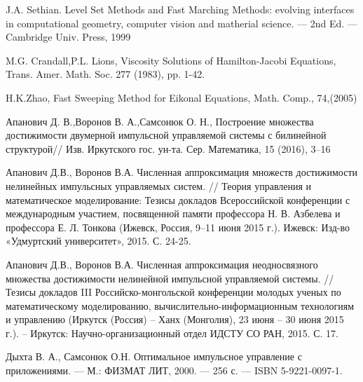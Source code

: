 \pagebreak
\begin{thebibliography}{99}

 {J.A. Sethian.} Level Set Methods and Fast Marching Methods: evolving
  interfaces in computational geometry, computer vision and matherial
  science. — 2nd Ed. — Cambridge Univ. Press, 1999

 {M.G. Crandall,P.L. Lions}, Viscosity Solutions of Hamilton-Jacobi Equations, Trans. Amer. Math. Soc. 277 (1983), pp. 1-42.

 {H.K.Zhao}, Fast Sweeping Method for Eikonal Equations, Math. Comp.,
74,(2005)
  
 {Апанович Д. В.,Воронов В. А.,Самсонюк О. Н.},
  Построение множества достижимости двумерной импульсной управляемой
  системы с билинейной структурой// Изв. Иркутского
  гос. ун-та. Сер. Математика, 15 (2016), 3–16

 Апанович Д.В., Воронов В.А. Численная аппроксимация
  множеств достижимости нелинейных импульсных управляемых систем. //
  Теория управления и математическое моделирование: Тезисы докладов
  Всероссийской конференции с международным участием, посвященной
  памяти профессора Н. В. Азбелева и профессора Е. Л. Тонкова (Ижевск,
  Россия, 9–11 июня 2015 г.). Ижевск: Изд-во «Удмуртский университет»,
  2015. С. 24-25.

 Апанович Д.В., Воронов В.А. Численная аппроксимация
  неодносвязного множества достижимости нелинейной импульсной
  управляемой системы. //  Тезисы докладов III Российско-монгольской
  конференции молодых ученых по математическому моделированию,
  вычислительно-информационным технологиям и управлению (Иркутск
  (Россия) – Ханх (Монголия), 23 июня – 30 июня 2015 г.). – Иркутск:
  Научно-организационный отдел ИДСТУ СО РАН, 2015. С. 17.


 {Дыхта В. А., Самсонюк О.Н.} Оптимальное импульсное
  управление с приложениями. — М.: ФИЗМАТ ЛИТ, 2000. — 256 с. — ISBN
  5-9221-0097-1.


  
\end{thebibliography}


